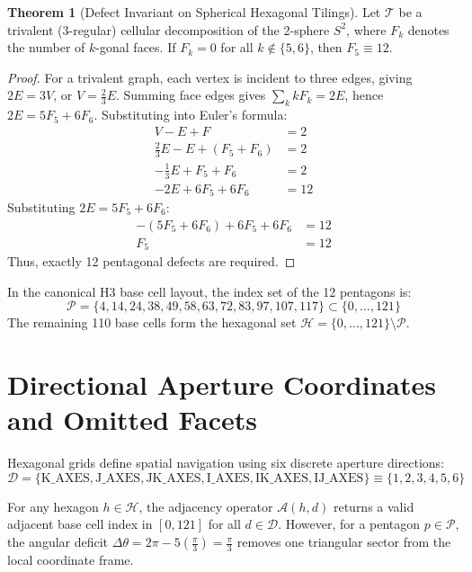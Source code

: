 \documentclass[11pt,a4paper]{article}
\theoremstyle{definition}
\newtheorem{theorem}{Theorem}[section]
\begin{document}
\begin{theorem}[Defect Invariant on Spherical Hexagonal Tilings]
Let $\mathcal{T}$ be a trivalent (3-regular) cellular decomposition of the 2-sphere $S^2$, where $F_k$ denotes the number of $k$-gonal faces. If $F_k = 0$ for all $k \notin \{5, 6\}$, then $F_5 \equiv 12$.
\end{theorem}

\begin{proof}
For a trivalent graph, each vertex is incident to three edges, giving $2E = 3V$, or $V = \frac{2}{3}E$. 
Summing face edges gives $\sum_{k} k F_k = 2E$, hence $2E = 5F_5 + 6F_6$.
Substituting into Euler's formula:
\begin{align}
V - E + F &= 2 \nonumber \\
\frac{2}{3}E - E + (F_5 + F_6) &= 2 \nonumber \\
-\frac{1}{3}E + F_5 + F_6 &= 2 \nonumber \\
-2E + 6F_5 + 6F_6 &= 12
\end{align}
Substituting $2E = 5F_5 + 6F_6$:
\begin{align}
-(5F_5 + 6F_6) + 6F_5 + 6F_6 &= 12 \nonumber \\
F_5 &= 12
\end{align}
Thus, exactly 12 pentagonal defects are required.
\end{proof}

In the canonical H3 base cell layout, the index set of the 12 pentagons is:
\begin{equation}
\mathcal{P} = \{4, 14, 24, 38, 49, 58, 63, 72, 83, 97, 107, 117\} \subset \{0, \dots, 121\}
\end{equation}
The remaining 110 base cells form the hexagonal set $\mathcal{H} = \{0, \dots, 121\} \setminus \mathcal{P}$.

\section{Directional Aperture Coordinates and Omitted Facets}

Hexagonal grids define spatial navigation using six discrete aperture directions:
\begin{equation}
\mathcal{D} = \{ \text{K\_AXES}, \text{J\_AXES}, \text{JK\_AXES}, \text{I\_AXES}, \text{IK\_AXES}, \text{IJ\_AXES} \} \equiv \{1, 2, 3, 4, 5, 6\}
\end{equation}

For any hexagon $h \in \mathcal{H}$, the adjacency operator $\mathcal{A}(h, d)$ returns a valid adjacent base cell index in $[0, 121]$ for all $d \in \mathcal{D}$. However, for a pentagon $p \in \mathcal{P}$, the angular deficit $\Delta \theta = 2\pi - 5(\frac{\pi}{3}) = \frac{\pi}{3}$ removes one triangular sector from the local coordinate frame.
\end{document}
